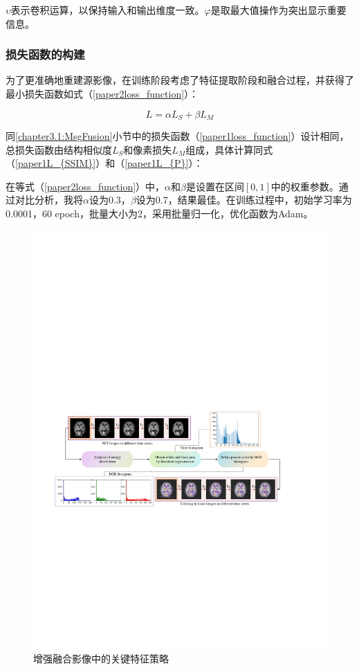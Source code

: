 $\upsilon$表示卷积运算，以保持输入和输出维度一致。$\varphi$是取最大值操作为突出显示重要信息。



\subsubsection{损失函数的构建}\label{chapter3.2:Loss_function}
为了更准确地重建源影像，在训练阶段考虑了特征提取阶段和融合过程，并获得了最小损失函数如式（\ref{paper2loss_function}）：

 \begin{equation}\label{paper2loss_function}
   L=\alpha L_S +\beta L_M
 \end{equation}

同\ref{chapter3.1:MsgFusion}小节中的损失函数（\ref{paper1loss_function}）设计相同，总损失函数由结构相似度$L_{S}$和像素损失$L_{M}$组成，具体计算同式（\ref{paper1L_{SSIM}}）和（\ref{paper1L_{P}}）：


在等式（\ref{paper2loss_function}）中，$\alpha$和$\beta $是设置在区间$[0,1]$中的权重参数。通过对比分析，我将$\alpha $设为0.3，$\beta $设为0.7，结果最佳。在训练过程中，初始学习率为0.0001，60 epoch，批量大小为2，采用批量归一化，优化函数为Adam。

    \begin{figure}[htbp]
      \centering
      \includegraphics[width=0.9\linewidth]{figs/paper2visualization2023.pdf}
      \caption{增强融合影像中的关键特征策略}\label{paper2visualization}
    \end{figure}
    
